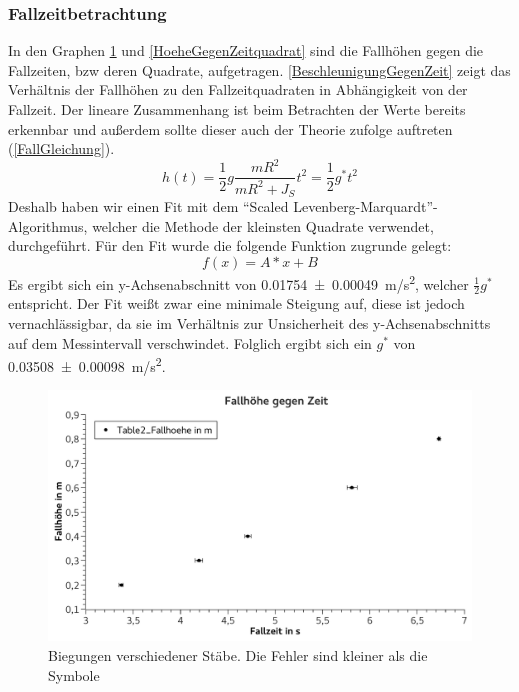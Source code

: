 \documentclass[
	a4paper,
	12pt,
	pagesize,
	ngerman
]{scrartcl}
\begin{document}
	\subsubsection*{Fallzeitbetrachtung}%
	In den Graphen \cref{HoeheGegenZeit} und \cref{HoeheGegenZeitquadrat} sind die Fallhöhen gegen die Fallzeiten, bzw deren Quadrate, aufgetragen.
	\cref{BeschleunigungGegenZeit} zeigt das Verhältnis der Fallhöhen zu den Fallzeitquadraten in Abhängigkeit von der Fallzeit.
	Der lineare Zusammenhang ist beim Betrachten der Werte bereits erkennbar und außerdem sollte dieser auch der Theorie zufolge auftreten (\cref{FallGleichung}).
	\begin{equation}
		h(t) = \frac{1}{2} g \frac{mR^2}{mR^2+J_S} t^2 = \frac{1}{2} g^* t^2
		\label{FallGleichung}
	\end{equation}
	Deshalb haben wir einen Fit mit dem \enquote{Scaled Levenberg-Marquardt}-Algorithmus, welcher die Methode der kleinsten Quadrate verwendet, durchgeführt.
	Für den Fit wurde die folgende Funktion zugrunde gelegt:
	\begin{equation}
		f(x)=A*x+B
	\end{equation}
	Es ergibt sich ein y-Achsenabschnitt von \SI{0,01754\pm 0,00049}{m/s^2}, welcher $\frac{1}{2}g^*$ entspricht. Der Fit weißt zwar eine minimale Steigung auf, diese ist jedoch vernachlässigbar, da sie im Verhältnis zur Unsicherheit des y-Achsenabschnitts auf dem Messintervall verschwindet. Folglich ergibt sich ein $g^*$ von \SI{0,03508 \pm 0,00098}{m/s^2}.
	\begin{figure}[tb]
		\includegraphics[width=1\textwidth]{HoeheGegenZeit}
		\centering
		\caption{Biegungen verschiedener Stäbe. Die Fehler sind kleiner als die Symbole}
		\label{HoeheGegenZeit}
		\centering
	\end{figure}
\end{document}
